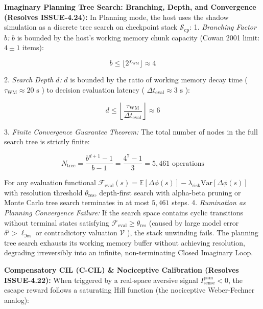 \documentclass[11pt,a4paper]{article}
\theoremstyle{definition}
\theoremstyle{remark}
\begin{document}
\textbf{Imaginary Planning Tree Search: Branching, Depth, and Convergence (Resolves ISSUE-4.24):}
In Planning mode, the host uses the shadow simulation as a discrete tree search on checkpoint stack $\mathcal{S}_{\text{cp}}$:
1. \textit{Branching Factor $b$:} $b$ is bounded by the host's working memory chunk capacity (Cowan 2001 limit: $4 \pm 1$ items):


\begin{equation}
\boxed{b \le \lfloor 2^{\chi_{\text{WM}}} \rfloor \approx 4}
\end{equation}


2. \textit{Search Depth $d$:} $d$ is bounded by the ratio of working memory decay time ( $\tau_{\text{WM}} \approx 20\text{ s}$ ) to decision evaluation latency ( $\Delta t_{\text{eval}} \approx 3\text{ s}$ ):


\begin{equation}
\boxed{d \le \left\lfloor \frac{\tau_{\text{WM}}}{\Delta t_{\text{eval}}} \right\rfloor \approx 6}
\end{equation}


3. \textit{Finite Convergence Guarantee Theorem:} The total number of nodes in the full search tree is strictly finite:


\begin{equation}
N_{\text{tree}} = \frac{b^{d+1} - 1}{b - 1} = \frac{4^7 - 1}{3} = 5{,}461 \text{ operations}
\end{equation}


For any evaluation functional $\mathcal{F}_{\text{eval}}(s) = \mathbb{E}[\Delta\phi(s)] - \lambda_{\text{risk}}\text{Var}[\Delta\phi(s)]$ with resolution threshold $\theta_{\text{res}}$, depth-first search with alpha-beta pruning or Monte Carlo tree search terminates in at most $5{,}461$ steps.
4. \textit{Rumination as Planning Convergence Failure:} If the search space contains cyclic transitions without terminal states satisfying $\mathcal{F}_{\text{eval}} \ge \theta_{\text{res}}$ (caused by large model error $\delta^j > \ell_{\mathfrak{Im}}$ or contradictory valuation $\mathcal{V}$ ), the stack unwinding fails. The planning tree search exhausts its working memory buffer without achieving resolution, degrading irreversibly into an infinite, non-terminating Closed Imaginary Loop.

\textbf{Compensatory CIL (C-CIL) \& Nociceptive Calibration (Resolves ISSUE-4.22):}
When triggered by a real-space aversive signal $I_{\text{sense}}^{\text{pain}} < 0$, the escape reward follows a saturating Hill function (the nociceptive Weber-Fechner analog):
\end{document}
